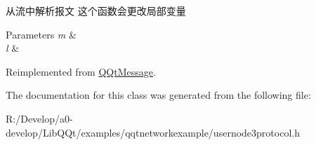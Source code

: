 从流中解析报文 这个函数会更改局部变量 


\begin{DoxyParams}{Parameters}
{\em m} & \\
\hline
{\em l} & \\
\hline
\end{DoxyParams}


Reimplemented from \mbox{\hyperlink{class_q_qt_message_a0bc25669bdd61490b1d8df6d77565f31}{Q\+Qt\+Message}}.



The documentation for this class was generated from the following file\+:\begin{DoxyCompactItemize}
\item 
R\+:/\+Develop/a0-\/develop/\+Lib\+Q\+Qt/examples/qqtnetworkexample/usernode3protocol.\+h\end{DoxyCompactItemize}
